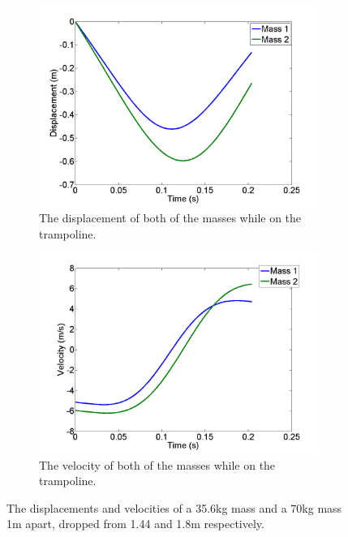 \begin{figure}[H]
	\centering
    \begin{subfigure}{0.45\textwidth}
		\includegraphics[width=\textwidth]{2MM_Disp.png}
    	\caption{The displacement of both of the masses while on the trampoline.}\label{fig:2MM_Disp}
    \end{subfigure}\hfill
	\begin{subfigure}{0.45\textwidth}
		\includegraphics[width=\textwidth]{2MM_Vel.png}
    	\caption{The velocity of both of the masses while on the trampoline.}\label{fig:2MM_Vel}
    \end{subfigure}\hfill
    \caption{The displacements and velocities of a 35.6kg mass and a 70kg mass 1m apart, dropped from 1.44 and 1.8m respectively.}\label{fig:2MM_Disp_Vel}
\end{figure}

